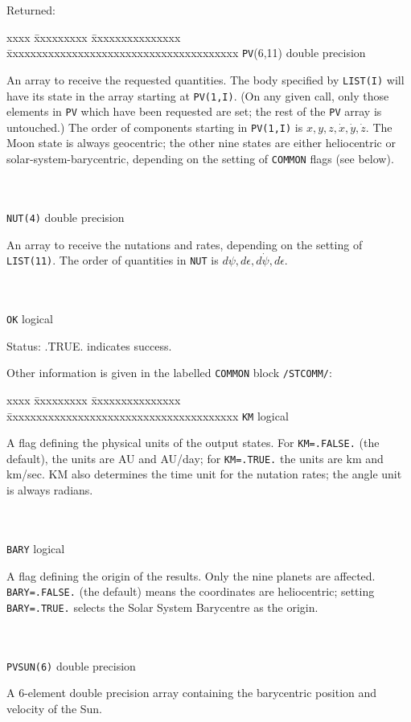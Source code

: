 \pagebreak
Returned:
\begin{tabbing}
xxxx \= xxxxxxxxx \= xxxxxxxxxxxxxxx \=
xxxxxxxxxxxxxxxxxxxxxxxxxxxxxxxxxxxxxxx \kill
\> \verb|PV|(6,11) \> double precision \>
             \parbox[t]{24em}{An
         array to receive
         the requested quantities.  The body
         specified by \verb|LIST(I)| will have its state in the array
         starting at \verb|PV(1,I)|.  (On any given call, only those
         elements in \verb|PV| which have been requested are set; the
         rest of the \verb|PV| array is untouched.)  The order of
         components starting in \verb|PV(1,I)|
         is $x, y, z, \dot{x}, \dot{y}, \dot{z}$.
         The Moon state is always geocentric;
         the other nine states are either heliocentric or
         solar-system-barycentric, depending on the setting of
         \verb|COMMON| flags (see below).} \\ \\
\> \verb|NUT(4)| \> double precision \>
             \parbox[t]{24em}{An
         array to receive the
         nutations and rates, depending on
         the setting of \verb|LIST(11)|.
         The order of quantities in \verb|NUT| is
         $d\psi, d\epsilon, d\dot{\psi}, d\dot{\epsilon}$.} \\ \\
\> \verb|OK| \> logical \>
             \parbox[t]{24em}{Status:  .TRUE. indicates success.}
\end{tabbing}
                     
Other information is given in the labelled \verb|COMMON|
block \verb|/STCOMM/|:
\begin{tabbing}
xxxx \= xxxxxxxxx \= xxxxxxxxxxxxxxx \=
xxxxxxxxxxxxxxxxxxxxxxxxxxxxxxxxxxxxxxx \kill
\> \verb|KM| \> logical \>
             \parbox[t]{24em}{A flag defining the physical units of the output
 states. For \verb|KM=.FALSE.| (the default),
 the units are AU and AU/day; for \verb|KM=.TRUE.| the units are
 km and km/sec.
 KM also determines the time unit for the nutation rates; the
 angle unit is always radians.} \\ \\
\> \verb|BARY| \> logical \>
             \parbox[t]{24em}{A flag defining the origin of the results.
Only the nine planets are affected.  \verb|BARY=.FALSE.| (the default)
means the coordinates are heliocentric;  setting \verb|BARY=.TRUE.|
selects the Solar System Barycentre as the origin.} \\ \\
\> \verb|PVSUN(6)| \> double precision \>
             \parbox[t]{24em}{A 6-element
         double precision array containing the
         barycentric position and velocity of the Sun.}
\end{tabbing}

